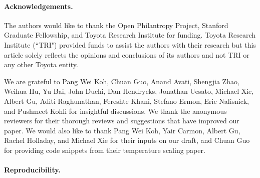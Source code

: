 \paragraph{Acknowledgements.}

The authors would like to thank the Open Philantropy Project, Stanford Graduate Fellowship, and Toyota Research Institute for funding. Toyota Research Institute (``TRI") provided funds to assist the authors with their research but this article solely reflects the opinions and conclusions of its authors and not TRI or any other Toyota entity.

We are grateful to Pang Wei Koh, Chuan Guo, Anand Avati, Shengjia Zhao, Weihua Hu, Yu Bai, John Duchi, Dan Hendrycks, Jonathan Uesato, Michael Xie, Albert Gu, Aditi Raghunathan, Fereshte Khani, Stefano Ermon, Eric Nalisnick, and Pushmeet Kohli for insightful discussions. We thank the anonymous reviewers for their thorough reviews and suggestions that have improved our paper. We would also like to thank Pang Wei Koh, Yair Carmon, Albert Gu, Rachel Holladay, and Michael Xie for their inputs on our draft, and Chuan Guo for providing code snippets from their temperature scaling paper.

\paragraph{Reproducibility.}






